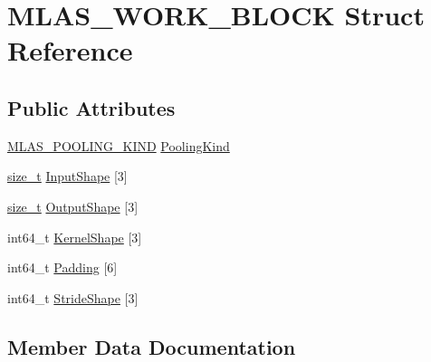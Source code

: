 \hypertarget{structMLAS__WORK__BLOCK}{}\section{M\+L\+A\+S\+\_\+\+W\+O\+R\+K\+\_\+\+B\+L\+O\+CK Struct Reference}
\label{structMLAS__WORK__BLOCK}
\subsection*{Public Attributes}
\begin{DoxyCompactItemize}
\item 
\mbox{\hyperlink{mlas_8h_a308be0f1e44b0324610000287f348222}{M\+L\+A\+S\+\_\+\+P\+O\+O\+L\+I\+N\+G\+\_\+\+K\+I\+ND}} \mbox{\hyperlink{structMLAS__WORK__BLOCK_a119f68d890c321442327ce71bbea00bd}{Pooling\+Kind}}
\item 
\mbox{\hyperlink{mlasi_8h_a503efbc1c6e50825320ad909366b78ab}{size\+\_\+t}} \mbox{\hyperlink{structMLAS__WORK__BLOCK_a578a22ea751ac4c2c6d86bc583c1774b}{Input\+Shape}} \mbox{[}3\mbox{]}
\item 
\mbox{\hyperlink{mlasi_8h_a503efbc1c6e50825320ad909366b78ab}{size\+\_\+t}} \mbox{\hyperlink{structMLAS__WORK__BLOCK_a4442760ec2c6cd113a5e69e98063b868}{Output\+Shape}} \mbox{[}3\mbox{]}
\item 
int64\+\_\+t \mbox{\hyperlink{structMLAS__WORK__BLOCK_a0445ce1d5b88d8b243cb9c329c1a5275}{Kernel\+Shape}} \mbox{[}3\mbox{]}
\item 
int64\+\_\+t \mbox{\hyperlink{structMLAS__WORK__BLOCK_a47fbc5f3d06154c7fd8ef37d9c017999}{Padding}} \mbox{[}6\mbox{]}
\item 
int64\+\_\+t \mbox{\hyperlink{structMLAS__WORK__BLOCK_adc2851f7310ef1b5c1c387cd9604405e}{Stride\+Shape}} \mbox{[}3\mbox{]}
\end{DoxyCompactItemize}


\subsection{Member Data Documentation}
\mbox{\label{structMLAS__WORK__BLOCK_a578a22ea751ac4c2c6d86bc583c1774b}} 

